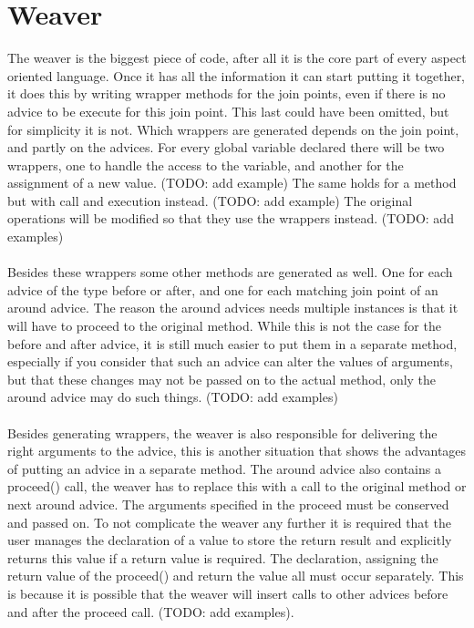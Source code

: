 \documentclass[a4paper]{report}
\begin{document}
\section{Weaver}
The weaver is the biggest piece of code, after all it is the core part of every aspect oriented language. Once it has all the information it can start putting it together, it does this by writing wrapper methods for the join points, even if there is no advice to be execute for this join point. This last could have been omitted, but for simplicity it is not. Which wrappers are generated depends on the join point, and partly on the advices. For every global variable declared there will be two wrappers, one to handle the access to the variable, and another for the assignment of a new value. (TODO: add example) The same holds for a method but with call and execution instead. (TODO: add example) The original operations will be modified so that they use the wrappers instead. (TODO: add examples)\\
\\
Besides these wrappers some other methods are generated as well. One for each advice of the type before or after, and one for each matching join point of an around advice. The reason the around advices needs multiple instances is that it will have to proceed to the original method. While this is not the case for the before and after advice, it is still much easier to put them in a separate method, especially if you consider that such an advice can alter the values of arguments, but that these changes may not be passed on to the actual method, only the around advice may do such things. (TODO: add examples)\\
\\
Besides generating wrappers, the weaver is also responsible for delivering the right arguments to the advice, this is another situation that shows the advantages of putting an advice in a separate method. The around advice also contains a proceed() call, the weaver has to replace this with a call to the original method or next around advice. The arguments specified in the proceed must be conserved and passed on. To not complicate the weaver any further it is required that the user manages the declaration of a value to store the return result and explicitly returns this value if a return value is required. The declaration, assigning the return value of the proceed() and return the value all must occur separately. This is because it is possible that the weaver will insert calls to other advices before and after the proceed call. (TODO: add examples).\\
\end{document}
